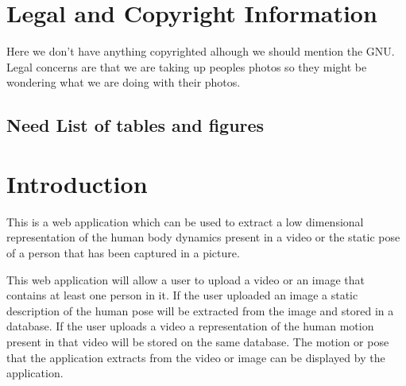 \documentclass{scrreprt}
\begin{document}
\newcommand{\requirement}[9]{%
\fbox{\parbox{\textwidth}{%
\parbox[t]{.333\textwidth}{\raggedright%
\textbf{Req. \#}: \refstepcounter{RequirementNumber} \arabic{RequirementNumber} \label{#1}}%
\parbox[t]{.333\textwidth}{\centering%
\textbf{Req. Type}: #2}%
\parbox[t]{.333\textwidth}{\raggedleft%
\textbf{Use Case \#}: \ref{#3}}
\newline\\
\textbf{Description}: #4\\\\
\textbf{Rationale}: #5\\\\
\textbf{Originator}: #6\\\\
\textbf{Fit Criterion}: #7\\\\
\textbf{Priority}: #8 \hfill \textbf{History}: #9\\\\
}}}

\section{Legal and Copyright Information}

Here we don't have anything copyrighted alhough we should 
mention the GNU.  Legal concerns are that we are taking 
up peoples photos so they might be wondering what we are 
doing with their photos.

\subsection{Need List of tables and figures}

\section{Introduction}
This is a web application which can be used to extract a low dimensional representation of the human body dynamics present in a video or the static pose of a person that has been captured in a picture.

  This web application will allow a user to upload a video or an image that contains at least one person in it. If the user uploaded an image a static description of the human pose will be extracted from the image and stored in a database.  If the user uploads a video a representation of the human motion present in that video will be stored on the same database.  The motion or pose that the application extracts from the video or image can be displayed by the application.
  
\end{document}
